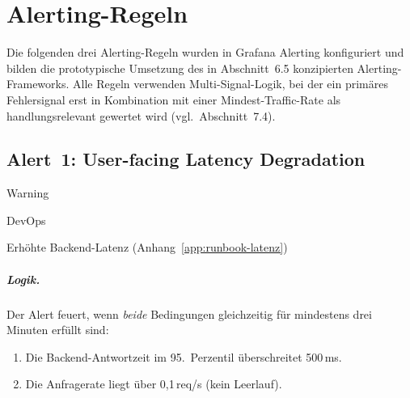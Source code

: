 \chapter{Alerting-Regeln}
\label{app:alerting-rules}

\newcommand{\promqlheading}[1]{\paragraph{#1}\leavevmode\par\vspace{0.25\baselineskip}}

Die folgenden drei Alerting-Regeln wurden in Grafana Alerting konfiguriert und bilden die prototypische Umsetzung des in Abschnitt~6.5 konzipierten Alerting-Frameworks. Alle Regeln verwenden Multi-Signal-Logik, bei der ein primäres Fehlersignal erst in Kombination mit einer Mindest-Traffic-Rate als handlungsrelevant gewertet wird (vgl.\ Abschnitt~7.4).


\section{Alert~1: User-facing Latency Degradation}

\begin{description}[style=sameline, leftmargin=5.4cm, labelwidth=4.6cm, labelsep=0.8cm]
  \item[Severity] Warning
  \item[Primäre Rolle] DevOps
  \item[Zugehöriges Runbook] Erhöhte Backend-Latenz (Anhang~\ref{app:runbook-latenz})
\end{description}

\paragraph{Logik.}
Der Alert feuert, wenn \emph{beide} Bedingungen gleichzeitig für mindestens drei Minuten erfüllt sind:
\begin{enumerate}
  \item Die Backend-Antwortzeit im 95.\ Perzentil überschreitet 500\,ms.
  \item Die Anfragerate liegt über 0{,}1\,req/s (kein Leerlauf).
\end{enumerate}

